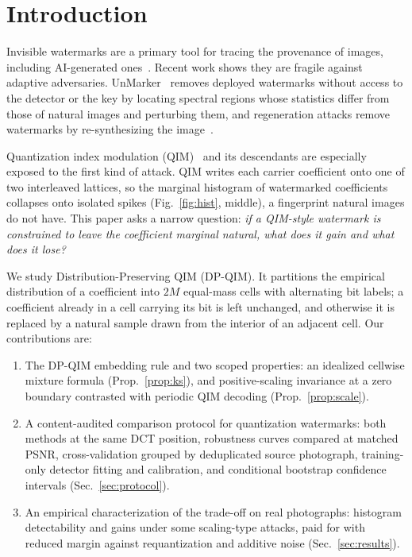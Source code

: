 \documentclass[conference,10pt]{IEEEtran}
\begin{document}
\section{Introduction}
\label{sec:intro}

Invisible watermarks are a primary tool for tracing the provenance of images,
including AI-generated ones~\cite{Cox2007book}. Recent work shows they are
fragile against adaptive adversaries. UnMarker~\cite{Kassis2025unmarker}
removes deployed watermarks without access to the detector or the key by
locating spectral regions whose statistics differ from those of natural images
and perturbing them, and regeneration attacks remove watermarks by re-synthesizing
the image~\cite{Zhao2023removable,Erasing2024neurips}.

Quantization index modulation (QIM)~\cite{Chen2001qim} and its descendants are
especially exposed to the first kind of attack. QIM writes each carrier
coefficient onto one of two interleaved lattices, so the marginal histogram of
watermarked coefficients collapses onto isolated spikes
(Fig.~\ref{fig:hist}, middle), a fingerprint natural images do not have.
This paper asks a narrow question: \emph{if a QIM-style watermark is
constrained to leave the coefficient marginal natural, what does it gain and
what does it lose?}

We study Distribution-Preserving QIM (DP-QIM). It partitions the empirical
distribution of a coefficient into $2M$ equal-mass cells with alternating bit
labels; a coefficient already in a cell carrying its bit is left unchanged,
and otherwise it is replaced by a natural sample drawn from the interior of an
adjacent cell. Our contributions are:
\begin{enumerate}
\item The DP-QIM embedding rule and two scoped properties: an idealized
cellwise mixture formula (Prop.~\ref{prop:ks}), and positive-scaling invariance
at a zero boundary contrasted with periodic QIM decoding (Prop.~\ref{prop:scale}).
\item A content-audited comparison protocol for quantization watermarks: both
methods at the same DCT position, robustness curves compared at matched PSNR,
cross-validation grouped by deduplicated source photograph, training-only
detector fitting and calibration, and conditional bootstrap confidence intervals
(Sec.~\ref{sec:protocol}).
\item An empirical characterization of the trade-off on real photographs:
histogram detectability and gains under some scaling-type attacks, paid for
with reduced margin against requantization and additive noise
(Sec.~\ref{sec:results}).
\end{enumerate}
\end{document}
